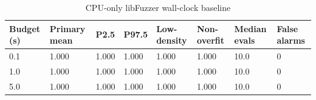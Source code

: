 \begin{table}[t]
\centering
\small
\begin{tabular}{llllllll}
\toprule
Budget (s) & Primary mean & P2.5 & P97.5 & Low-density & Non-overfit & Median evals & False alarms \\
\midrule
0.1 & 1.000 & 1.000 & 1.000 & 1.000 & 1.000 & 10.0 & 0 \\
1.0 & 1.000 & 1.000 & 1.000 & 1.000 & 1.000 & 10.0 & 0 \\
5.0 & 1.000 & 1.000 & 1.000 & 1.000 & 1.000 & 10.0 & 0 \\
\bottomrule
\end{tabular}
\caption{CPU-only libFuzzer wall-clock baseline}
\end{table}

